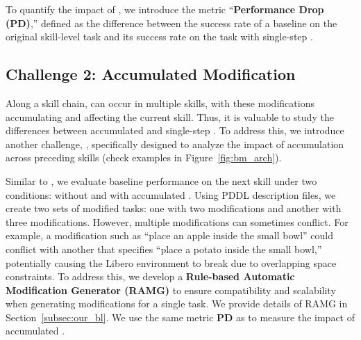 To quantify the impact of \pb, we introduce the metric ``\textbf{Performance Drop (PD)},'' defined as the difference between the success rate of a baseline on the original skill-level task and its success rate on the task with single-step \pb{}.



\subsection{Challenge 2: Accumulated Modification}
\label{subsec:bm_2}
Along a skill chain, \pb can occur in multiple skills, with these modifications accumulating and affecting the current skill. Thus, it is valuable to study the differences between accumulated \pb and single-step \pb. To address this, we introduce another challenge, \bmb, specifically designed to analyze the impact of \pb accumulation across preceding skills (check examples in Figure~\ref{fig:bm_arch}). 

Similar to \bma, we evaluate baseline performance on the next skill under two conditions: without \pb and with accumulated \pb. Using PDDL description files, we create two sets of modified tasks: one with two modifications and another with three modifications. However, multiple modifications can sometimes conflict. For example, a modification such as ``place an apple inside the small bowl'' could conflict with another that specifies ``place a potato inside the small bowl,'' potentially causing the Libero environment to break due to overlapping space constraints. To address this, we develop a \textbf{Rule-based Automatic Modification Generator (RAMG)} to ensure compatibility and scalability when generating modifications for a single task. We provide details of RAMG in Section~\ref{subsec:our_bl}. We use the same metric \textbf{PD} as \bma to measure the impact of accumulated \pb.




